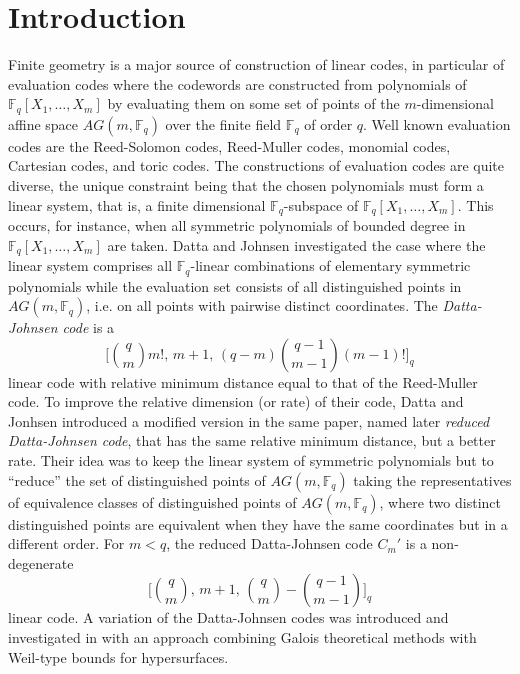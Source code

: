 \documentclass[sn-mathphys-num]{sn-jnl}%
\begin{document}
\section{Introduction}\label{sec1}
Finite geometry is a major source of construction of linear codes, in particular of evaluation codes where the codewords are constructed from polynomials of $\mathbb{F}_q[X_1,\ldots,X_m]$ by evaluating them on some set of points of the $m$-dimensional affine space $AG(m,\mathbb{F}_q)$  over the finite field $\mathbb{F}_q$ of order $q$. Well known evaluation codes are the Reed-Solomon codes, Reed-Muller codes, monomial codes, Cartesian codes, and toric codes. The constructions of evaluation codes are quite diverse, the unique constraint being that the chosen polynomials must form a linear system, that is, a finite dimensional $\mathbb{F}_q$-subspace of $\mathbb{F}_q[X_1,\ldots,X_m]$.  This occurs, for instance, when all symmetric polynomials of bounded degree in $\mathbb{F}_q[X_1,\ldots,X_m]$ are taken. Datta and Johnsen \cite{datta2023codes} investigated the case where the linear system comprises all $\mathbb{F}_q$-linear combinations of elementary symmetric polynomials while the evaluation set consists of all distinguished points in $AG(m,\mathbb{F}_q)$, i.e. on all points with pairwise distinct coordinates. The \emph{Datta-Johnsen code} is a $$\Big[\binom{q}{m}m!,\,m+1,\,(q-m)\binom{q-1}{m-1}(m-1)!\Big]_q$$ linear code with relative minimum distance equal to that of the Reed-Muller code. To improve the relative dimension (or rate) of their code, Datta and Jonhsen introduced a modified version in the same paper, named later \emph{reduced Datta-Johnsen code}, that has the same relative minimum distance, but a better rate. Their idea was to keep the linear system of symmetric polynomials but to ``reduce'' the set of distinguished points of $AG(m,\mathbb{F}_q)$  taking the representatives of equivalence classes of distinguished points of $AG(m,\mathbb{F}_q)$, where two distinct distinguished points are equivalent when they have the same coordinates but in a different order. For $m < q$, the reduced Datta-Johnsen code $C_m'$ is a non-degenerate $$\Big[\binom{q}{m},\,m+1,\,\binom{q}{m}- \binom{q-1}{m-1}\Big]_q$$ linear code.
A variation of the Datta-Johnsen codes was introduced and investigated in \cite{Mi2} with an approach combining Galois theoretical methods with Weil-type bounds for hypersurfaces.
\end{document}
